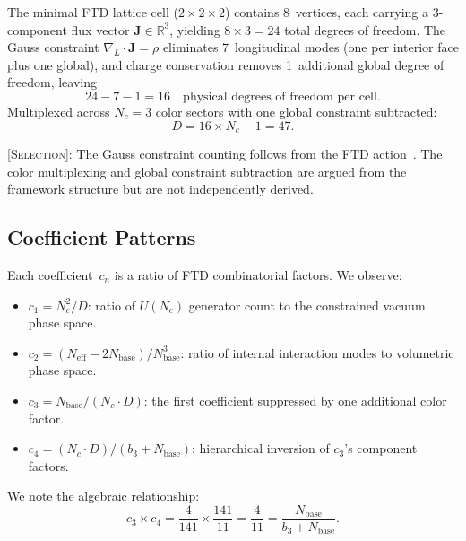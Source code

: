 \documentclass[11pt,twoside]{article}
\theoremstyle{remark}
\newcommand{\etag}[1]{\textsc{\small[#1]}}
\newcommand{\selection}{\etag{Selection}}
\begin{document}
The minimal FTD lattice cell ($2 \times 2 \times 2$) contains 8~vertices, each carrying a 3-component flux vector $\mathbf{J} \in \mathbb{R}^3$, yielding $8 \times 3 = 24$ total degrees of freedom.
The Gauss constraint $\nabla_L \cdot \mathbf{J} = \rho$ eliminates 7~longitudinal modes (one per interior face plus one global), and charge conservation removes 1~additional global degree of freedom, leaving
\begin{equation}
    24 - 7 - 1 = 16 \quad \text{physical degrees of freedom per cell.}
\end{equation}
Multiplexed across $N_c = 3$ color sectors with one global constraint subtracted:
\begin{equation}
\label{eq:D}
    D = 16 \times N_c - 1 = 47.
\end{equation}

\noindent \selection: The Gauss constraint counting follows from the FTD action~\cite{Anon2026}.
The color multiplexing and global constraint subtraction are argued from the framework structure but are not independently derived.


\subsection{Coefficient Patterns}
\label{sec:patterns}

Each coefficient~$c_n$ is a ratio of FTD combinatorial factors.
We observe:
\begin{itemize}[nosep]
    \item $c_1 = N_c^2/D$: ratio of $U(N_c)$ generator count to the constrained vacuum phase space.
    \item $c_2 = (N_{\mathrm{eff}} - 2N_{\mathrm{base}})/N_{\mathrm{base}}^3$: ratio of internal interaction modes to volumetric phase space.
    \item $c_3 = N_{\mathrm{base}}/(N_c \cdot D)$: the first coefficient suppressed by one additional color factor.
    \item $c_4 = (N_c \cdot D)/(b_3 + N_{\mathrm{base}})$: hierarchical inversion of $c_3$'s component factors.
\end{itemize}

\noindent We note the algebraic relationship:
\begin{equation}
\label{eq:c3c4}
    c_3 \times c_4 = \frac{4}{141} \times \frac{141}{11} = \frac{4}{11} = \frac{N_{\mathrm{base}}}{b_3 + N_{\mathrm{base}}}.
\end{equation}
\end{document}
